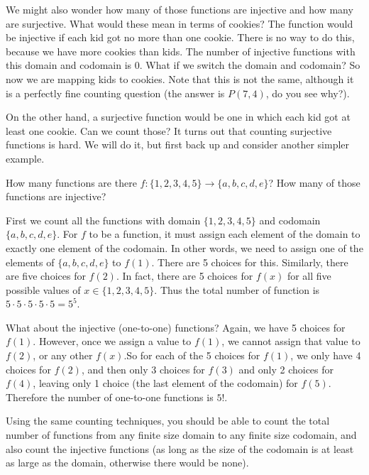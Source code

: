 \documentclass[12pt]{article}
\begin{document}
We might also wonder how many of those functions are injective and how many are surjective.  What would these mean in terms of cookies?  The function would be injective if each kid got no more than one cookie.  There is no way to do this, because we have more cookies than kids.  The number of injective functions with this domain and codomain is 0.  What if we switch the domain and codomain?  So now we are mapping kids to cookies.  Note that this is not the same, although it is a perfectly fine counting question (the answer is $P(7,4)$, do you see why?). 

On the other hand, a surjective function would be one in which each kid got at least one cookie.  Can we count those? It turns out that counting surjective functions is hard.  We will do it, but first back up and consider another simpler example.

\begin{example}
  How many functions are there $f: \{1,2,3,4,5\} \to \{a,b,c,d,e\}$?  How many of those functions are injective? 
  \begin{solution}
    First we count all the functions with domain $\{1,2,3,4,5\}$ and codomain $\{a,b,c,d,e\}$.  For $f$ to be a function, it must assign each element of the domain to exactly one element of the codomain.  In other words, we need to assign one of the elements of $\{a,b,c,d,e\}$ to $f(1)$.  There are 5 choices for this.  Similarly, there are five choices for $f(2)$.  In fact, there are 5 choices for $f(x)$ for all five possible values of $x \in \{1,2,3,4,5\}$.  Thus the total number of function is $5 \cdot 5 \cdot 5 \cdot 5 \cdot 5 = 5^5$.
    
    What about the injective (one-to-one) functions?  Again, we have 5 choices for $f(1)$.  However, once we assign a value to $f(1)$, we cannot assign that value to $f(2)$, or any other $f(x)$.\footnotemark  So for each of the 5 choices for $f(1)$, we only have 4 choices for $f(2)$, and then only 3 choices for $f(3)$ and only 2 choices for $f(4)$, leaving only 1 choice (the last element of the codomain) for $f(5)$.  Therefore the number of one-to-one functions is $5!$.
  \end{solution}

\end{example}

Using the same counting techniques, you should be able to count the total number of functions from any finite size domain to any finite size codomain, and also count the injective functions (as long as the size of the codomain is at least as large as the domain, otherwise there would be none).
\end{document}
